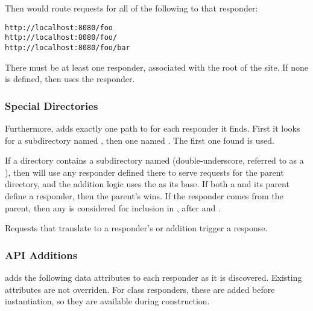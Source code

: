 Then  would route requests for all of the following to that
responder:

\begin{verbatim}
http://localhost:8080/foo
http://localhost:8080/foo/
http://localhost:8080/foo/bar
\end{verbatim}

There must be at least one responder, associated with the root of the site. If
none is defined, then  uses the  responder.


\subsubsection{Special Directories}

Furthermore,  adds exactly one path to  for
each responder it finds. First it looks for a subdirectory named
, then one named . The first one found is used.

If a directory contains a subdirectory named \file{__} (double-underscore,
referred to as a ), then  will use any
responder defined there to serve requests for the parent directory, and the
 addition logic uses the  as its base. If
both a  and its parent define a responder, then the
parent's wins. If the responder comes from the parent, then any  is considered for inclusion in , after
 and .

Requests that translate to a responder's  or
 addition trigger a 
response.


\subsubsection{API Additions}

 adds the following data attributes to each responder as it is
discovered. Existing attributes are not overriden. For class responders, these
are added before instantiation, so they are available during construction.

